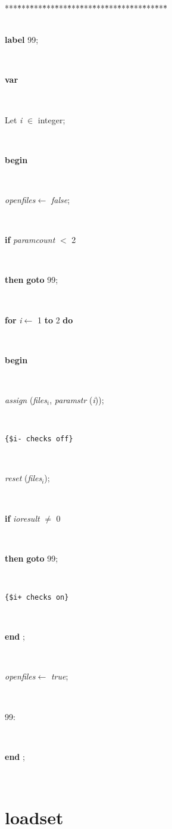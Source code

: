 \documentclass[10pt, a4paper]{article}
\begin{document}
\begin{tabbing}
***\=***\=***\=***\=***\=***\=***\=***\=***\=***\=***\=***\=***\=\kill
\\
\\
\parbox{14cm}{\textsf{\textbf{label}  99;}}\\
\+\parbox{14cm}{\textsf{\textbf{var} }}\\
\parbox{14cm}{\textsf{Let \textit{i} $\in$ integer;}}\\
\-\<\+\parbox{14cm}{\textsf{\textbf{begin} }}\\
\parbox{14cm}{\textsf{\textit{openfiles}$\leftarrow$ \textit{false}}; }\\
\parbox{14cm}{\textsf {\textbf {if } \textsf{\textit{paramcount} $<$ 2}}}\\
\parbox{14cm}{\textsf {\textbf {then }  \textbf{ goto } \textsf{99}; }}\\
\+\parbox{14cm}{\textsf {\textbf {for } \textsf{\textit{i}$\leftarrow$ 1} \textbf{ to } \textsf{2} \textbf{ do } }}\\
\<\parbox{14cm}{\textsf{\textbf{begin} }}\\
\parbox{14cm}{\textsf{\textit{assign} (\textit{files}$_{\textit{i}}$, \textit{paramstr} (\textit{i}))}; }\\
\parbox{14cm}{\texttt{\small{\{\$i- checks off\}}}}\\
\parbox{14cm}{\textsf{\textit{reset} (\textit{files}$_{\textit{i}}$)}; }\\
\parbox{14cm}{\textsf {\textbf {if } \textsf{\textit{ioresult} $\neq$ 0}}}\\
\parbox{14cm}{\textsf {\textbf {then }  \textbf{ goto } \textsf{99}; }}\\
\parbox{14cm}{\texttt{\small{\{\$i+ checks on\}}}}\\
\<\-\parbox{14cm}{\textsf{\textbf{end} ;}}\\
\parbox{14cm}{\textsf{\textit{openfiles}$\leftarrow$ \textit{true}}; }\\
\parbox{14cm}{\textsf{99:}}\\
\<\-\parbox{14cm}{\textsf{\textbf{end} ;}}\\
\end{tabbing}
\section{loadset}\label{sec:./uniquewordsloadset}
\end{document}
